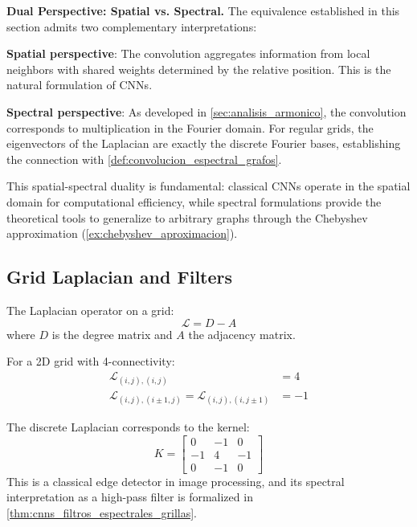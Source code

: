 \textbf{Dual Perspective: Spatial vs. Spectral.} The equivalence established in this section admits two complementary interpretations:

\textbf{Spatial perspective}: The convolution aggregates information from local neighbors with shared weights determined by the relative position. This is the natural formulation of CNNs.

\textbf{Spectral perspective}: As developed in \autoref{sec:analisis_armonico}, the convolution corresponds to multiplication in the Fourier domain. For regular grids, the eigenvectors of the Laplacian are exactly the discrete Fourier bases, establishing the connection with \autoref{def:convolucion_espectral_grafos}.

This spatial-spectral duality is fundamental: classical CNNs operate in the spatial domain for computational efficiency, while spectral formulations provide the theoretical tools to generalize to arbitrary graphs through the Chebyshev approximation (\autoref{ex:chebyshev_aproximacion}).

\subsection{Grid Laplacian and Filters}\label{subsec:laplaciano_grilla_filtros}

\begin{definition}\label{def:laplaciano_discreto_grilla}
The Laplacian operator on a grid:
\[
\mathcal{L} = D - A
\]
where \(D\) is the degree matrix and \(A\) the adjacency matrix.

For a 2D grid with 4-connectivity:
\begin{align}
\mathcal{L}_{(i,j),(i,j)} &= 4 \\
\mathcal{L}_{(i,j),(i \pm 1,j)} = \mathcal{L}_{(i,j),(i,j \pm 1)} &= -1
\end{align}
\end{definition}

\begin{example}
The discrete Laplacian corresponds to the kernel:
\[
K = \begin{bmatrix}
 0 & -1 &  0 \\
-1 &  4 & -1 \\
 0 & -1 &  0
\end{bmatrix}
\]
This is a classical edge detector in image processing, and its spectral interpretation as a high-pass filter is formalized in \autoref{thm:cnns_filtros_espectrales_grillas}.
\end{example}

